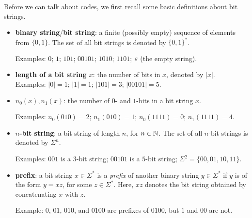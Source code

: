 \documentclass[format=acmsmall, review=false, screen=true]{acmart}
\begin{document}
Before we can talk about codes, we first recall
some basic definitions about bit strings.
\begin{itemize}
\item \textbf{binary string}/\textbf{bit string}:
a finite (possibly empty) sequence of elements from $\{0, 1\}$.
The set of all bit strings is denoted by $\{0, 1\}^*$.

Examples: $0$; $1$; $101$; $00101$; $1010$; $1101$; $\varepsilon$ (the empty 
string).
\item \textbf{length of a bit string $x$}: the number of bits
  in $x$, denoted by $|x|$.\\
Examples: $|0| = 1$; $|1| = 1$; $|101| = 3$; $|00101| = 5$. 
\item \textbf{$n_0(x), n_1(x)$}: the number of $0$- and $1$-bits
  in a bit string $x$.

 Examples:
  $n_0(010) = 2$; $n_1(010) = 1$; $n_0(1111) = 0$; $n_1(1111) = 4$.
\item \textbf{$n$-bit string}: a bit string of length $n$, for
  $n \in \mathbb{N}$.  The set of all $n$-bit strings is denoted by
  $\Sigma^n$.

Examples: $001$ is a $3$-bit string; $00101$ is a $5$-bit string;
  $\Sigma^2 = \{00, 01, 10, 11\}$.
\item \textbf{prefix}: a bit string
$x \in \Sigma^*$ is a \emph{prefix} of another binary string 
$y \in \Sigma^*$ if $y$ is of the form $y = xz$, for
some $z \in \Sigma^*$. Here, $xz$ denotes the bit string obtained
by concatenating $x$ with $z$.

Example:
$0$, $01$, $010$, and $0100$ are prefixes of $0100$,
but $1$ and $00$ are not.
\end{itemize}
\end{document}
